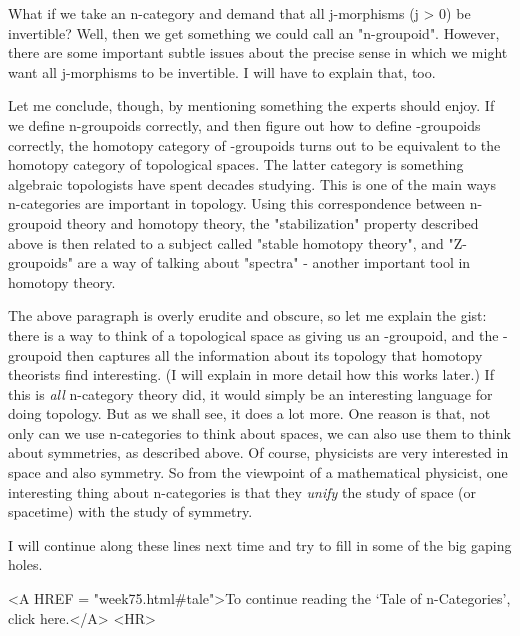 What if we take an n-category and demand that all j-morphisms (j > 0) be
invertible?  Well, then we get something we could call an "n-groupoid".
However, there are some important subtle issues about the precise sense
in which we might want all j-morphisms to be invertible.  I will have to
explain that, too.  

Let me conclude, though, by mentioning something the experts should
enjoy.  If we define n-groupoids correctly, and then figure out how to
define \omega -groupoids correctly, the homotopy category of
\omega -groupoids turns out to be equivalent to the homotopy category of
topological spaces.  The latter category is something algebraic
topologists have spent decades studying.  This is one of the main ways
n-categories are important in topology.  Using this correspondence
between n-groupoid theory and homotopy theory, the
"stabilization" property described above is then related to a
subject called "stable homotopy theory", and
"Z-groupoids" are a way of talking about "spectra" -
another important tool in homotopy theory.

The above paragraph is overly erudite and obscure, so let me explain the
gist: there is a way to think of a topological space as giving us an
\omega -groupoid, and the \omega -groupoid then captures all the information
about its topology that homotopy theorists find interesting.  (I will
explain in more detail how this works later.)  If this is \emph{all}
n-category theory did, it would simply be an interesting language for
doing topology.  But as we shall see, it does a lot more.  One reason is
that, not only can we use n-categories to think about spaces, we can
also use them to think about symmetries, as described above.  Of course,
physicists are very interested in space and also symmetry.  So from the
viewpoint of a mathematical physicist, one interesting thing about
n-categories is that they \emph{unify} the study of space (or spacetime) with
the study of symmetry.

I will continue along these lines next time and try to fill in some of
the big gaping holes.  

<A HREF = "week75.html#tale">To continue reading the `Tale of
n-Categories', click here.</A>
<HR>



